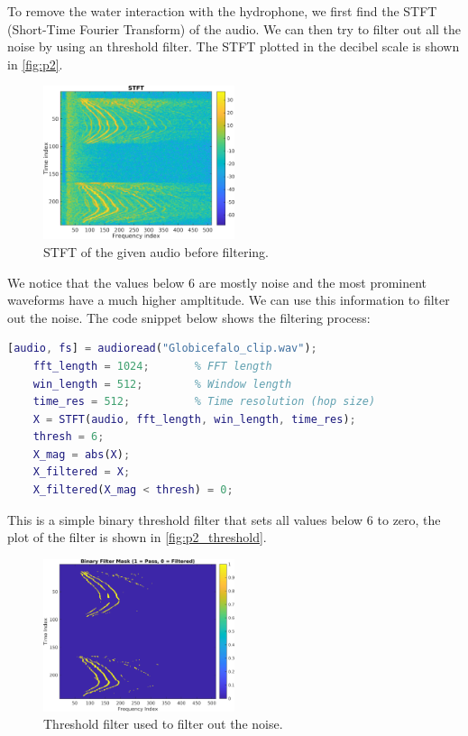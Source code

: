 \documentclass{article}
\begin{document}
To remove the water interaction with the hydrophone, we first find the STFT (Short-Time Fourier Transform) of the audio. We can then try to filter out all the noise by using an threshold filter. The STFT plotted in the decibel scale is shown in \autoref{fig:p2}.
\begin{figure}[ht!]
    \centering
    \includegraphics[width=0.5\textwidth]{p2.png}
    \caption{STFT of the given audio before filtering.}
    \label{fig:p2}
\end{figure}

We notice that the values below 6 are mostly noise and the most prominent waveforms have a much higher ampltitude. We can use this information to filter out the noise. The code snippet below shows the filtering process:
\begin{lstlisting}[language={MATLAB}, label={code:p2}, caption={Threshold Filter}]
    [audio, fs] = audioread("Globicefalo_clip.wav");
    fft_length = 1024;       % FFT length
    win_length = 512;        % Window length
    time_res = 512;          % Time resolution (hop size)
    X = STFT(audio, fft_length, win_length, time_res);
    thresh = 6;
    X_mag = abs(X);
    X_filtered = X;
    X_filtered(X_mag < thresh) = 0;
\end{lstlisting}
This is a simple binary threshold filter that sets all values below 6 to zero, the plot of the filter is shown in \autoref{fig:p2_threshold}.
\begin{figure}[ht!]
    \centering
    \includegraphics[width=0.5\textwidth]{filter.png}
    \caption{Threshold filter used to filter out the noise.}
    \label{fig:p2_threshold}
\end{figure}
\end{document}
